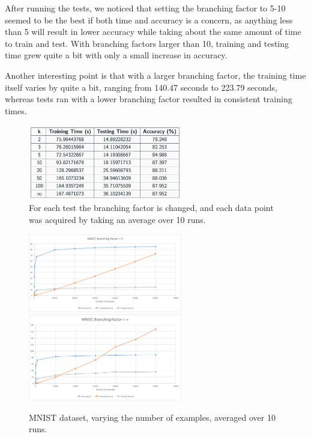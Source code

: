 \documentclass[10pt,letterpaper]{article}
\begin{document}
		After running the tests, we noticed that setting the branching factor to 5-10 seemed to be the best if both time and accuracy is a concern, as anything less than 5 will result in lower accuracy while taking about the same amount of time to train and test. With branching factors larger than 10, training and testing time grew quite a bit with only a small increase in accuracy.
		
		Another interesting point is that with a larger branching factor, the training time itself varies by quite a bit, ranging from 140.47 seconds to 223.79 seconds, whereas tests ran with a lower branching factor resulted in consistent training times.
		
		\begin{figure}[H]
			\caption{For each test the branching factor is changed, and each data point was acquired by taking an average over 10 runs.}
			\centering
			\includegraphics[width=0.60\textwidth]{mnist_varying_k.png}
		\end{figure}
	
		\begin{figure}[H]
			\caption{MNIST dataset, varying the number of examples, averaged over 10 runs.}
			\centering
			\includegraphics[width=0.60\textwidth]{mnistk5.png}
			\includegraphics[width=0.60\textwidth]{mnistkinfinity.png}
		\end{figure}
		
\end{document}

